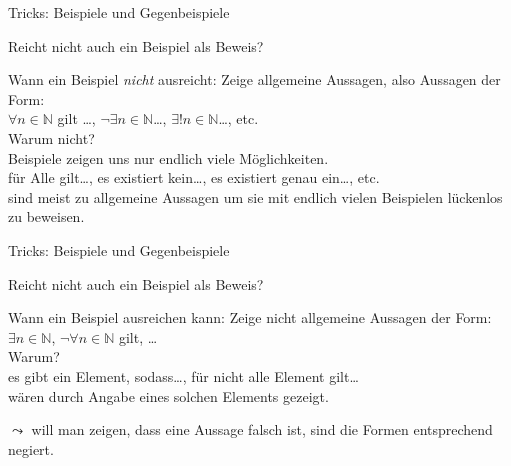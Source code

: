 \begin{frame}[fragile]{Tricks: Beispiele und Gegenbeispiele}
    \begin{alertblock}{Reicht nicht auch ein Beispiel als Beweis?}
    \end{alertblock}
    \begin{block}{Wann ein Beispiel \emph{nicht} ausreicht:}
        Zeige allgemeine Aussagen, also Aussagen der Form:\\$\forall n\in\mathbb{N}$ gilt \dots, $\neg\exists n\in\mathbb{N}$\dots, $\exists!n\in\mathbb{N}$\dots, etc.\\
        \alert{Warum nicht?}\\
        Beispiele zeigen uns nur endlich viele Möglichkeiten.\\
        \glqq für Alle gilt\dots\grqq, \glqq es existiert kein\dots\grqq, \glqq es existiert genau ein\dots\grqq, etc. \\sind meist zu allgemeine Aussagen um sie mit endlich vielen Beispielen lückenlos zu beweisen.
    \end{block}
\end{frame}

\begin{frame}[fragile]{Tricks: Beispiele und Gegenbeispiele}
    \begin{alertblock}{Reicht nicht auch ein Beispiel als Beweis?}
    \end{alertblock}
    \begin{block}{Wann ein Beispiel ausreichen kann:}
        Zeige nicht allgemeine Aussagen der Form:\\
        $\exists n\in\mathbb{N}$, $\neg\forall n\in\mathbb{N}$ gilt, \dots\\
        \alert{Warum?}\\
        \glqq es gibt ein Element, sodass\dots\grqq, \glqq für nicht alle Element gilt\dots\grqq\\wären durch Angabe eines solchen Elements gezeigt.
    \end{block}
        $\leadsto$ will man zeigen, dass eine Aussage falsch ist, sind die Formen entsprechend negiert.
\end{frame}
